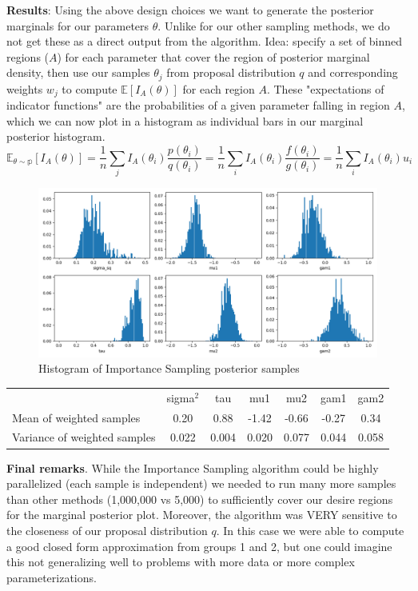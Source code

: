 \documentclass[12pt,letterpaper,twoside]{article}
\begin{document}
\textbf{Results}: Using the above design choices we want to generate 
the posterior marginals for our parameters $\theta$. Unlike for our other 
sampling methods, we do not get these as a direct output from the algorithm.
Idea: specify a set of binned regions ($A$) for each parameter  that cover 
the region of posterior marginal density, then use our samples $\theta_j$ 
from proposal distribution $q$ and corresponding weights $w_j$ to compute 
$\mathbb{E}[I_A(\theta)]$ for each region $A$. These "expectations of indicator 
functions" are the probabilities of a given parameter falling in region $A$, which 
we can now plot in a histogram as individual bars in our marginal posterior histogram.   
$$ \mathbb{E_{\theta \sim p}}[I_A(\theta)] = \frac{1}{n} \sum_j I_A(\theta_i) \frac{p(\theta_i)}{q(\theta_i)} = \frac{1}{n} \sum_i I_A(\theta_i) \frac{f(\theta_i)}{g(\theta_i)} = \frac{1}{n} \sum_i I_A(\theta_i) u_i$$
\begin{figure}[H]
    \centering
    \includegraphics[scale=0.55]{mis_sampled_histogram.png}
    \vspace*{-10mm}
    \caption{Histogram of Importance Sampling posterior samples}
\end{figure}

\begin{table}[H]
    \begin{tabular}{lcccccc}
    \multicolumn{1}{c}{}         & sigma$^2$ & tau   & mu1   & mu2   & gam1  & gam2  \\
    Mean of weighted samples     & 0.20  & 0.88  & -1.42 & -0.66 & -0.27 & 0.34  \\
    Variance of weighted samples & 0.022 & 0.004 & 0.020 & 0.077 & 0.044 & 0.058
    \end{tabular}
\end{table}

\textbf{Final remarks}. While the Importance Sampling algorithm could be highly parallelized 
(each sample is independent) we needed to run many more samples than other methods (1,000,000 
vs 5,000) to sufficiently cover our desire regions for the marginal posterior plot. Moreover, 
the algorithm was VERY sensitive to the closeness of our proposal distribution $q$. In this 
case we were able to compute a good closed form approximation from groups 1 and 2, but one 
could imagine this not generalizing well to problems with more data or more complex 
parameterizations.  
\end{document}
